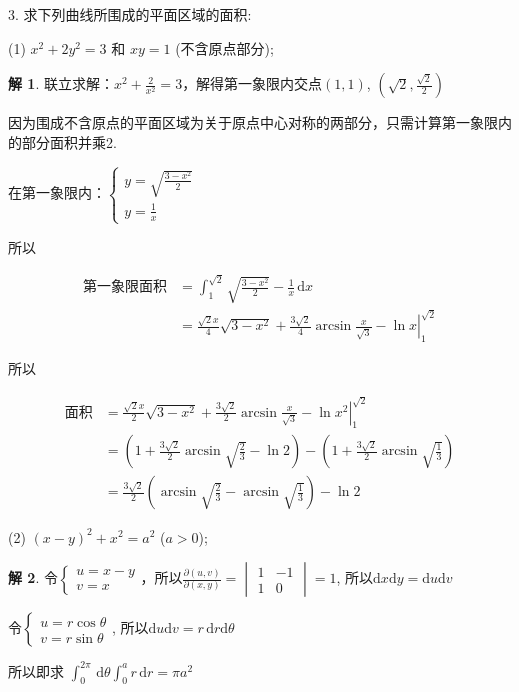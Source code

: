\documentclass[a4paper,12pt]{article}
\theoremstyle{definition}
\newtheorem*{sol}{解}
\begin{document}
3. 求下列曲线所围成的平面区域的面积:

(1) $x^2 + 2y^2 = 3$ 和 $xy = 1$ (不含原点部分);
\begin{sol}
    联立求解：$x^2+\frac{2}{x^2}=3$，解得第一象限内交点$(1,1)$, $(\sqrt{2},\frac{\sqrt{2}}{2})$

    因为围成不含原点的平面区域为关于原点中心对称的两部分，只需计算第一象限内的部分面积并乘2.

    在第一象限内：$\begin{cases}
            y=\sqrt{\frac{3-x^2}{2}} \\
            y=\frac{1}{x}
        \end{cases}$

    所以

    \begin{align*}
        \text{第一象限面积}
         & =\int_1^{\sqrt{2}}\sqrt{\frac{3-x^2}{2}}-\frac{1}{x}\,\mathrm{d}x                                             \\
         & =\left.\frac{\sqrt{2}x}{4}\sqrt{3-x^2}+\frac{3\sqrt{2}}{4}\arcsin\frac{x}{\sqrt{3}}-\ln x\right|_1^{\sqrt{2}}
    \end{align*}

    所以

    \begin{align*}
        \text{面积}
         & =\left.\frac{\sqrt{2}x}{2}\sqrt{3-x^2}+\frac{3\sqrt{2}}{2}\arcsin\frac{x}{\sqrt{3}}-\ln x^2\right|_1^{\sqrt{2}} \\
         & =(1+\frac{3\sqrt{2}}{2}\arcsin\sqrt{\frac{2}{3}}-\ln 2)-(1+\frac{3\sqrt{2}}{2}\arcsin\sqrt{\frac{1}{3}})        \\
         & =\frac{3\sqrt{2}}{2}(\arcsin\sqrt{\frac{2}{3}}-\arcsin\sqrt{\frac{1}{3}})-\ln 2
    \end{align*}
\end{sol}
(2) $(x - y)^2 + x^2 = a^2$ ($a > 0$);
\begin{sol}
    令$\begin{cases}
            u=x-y \\
            v=x
        \end{cases}$，所以$\frac{\partial(u,v)}{\partial(x,y)}=\begin{vmatrix}
            1 & -1 \\
            1 & 0
        \end{vmatrix}=1$, 所以$\mathrm{d}x\mathrm{d}y=\mathrm{d}u\mathrm{d}v$

    令$\begin{cases}
            u=r\cos\theta \\
            v=r\sin\theta
        \end{cases}$, 所以$\mathrm{d}u\mathrm{d}v=r\,\mathrm{d}r\mathrm{d}\theta$

    所以即求 $\int_0^{2\pi}\,\mathrm{d}\theta\int_0^a r\,\mathrm{d}r=\pi a^2$
\end{sol}
\end{document}
